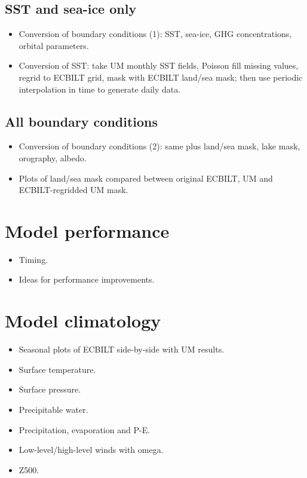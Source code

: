 \documentclass[a4paper,11pt,article]{memoir}
\begin{document}
\section{SST and sea-ice only}

\begin{itemize}
  \item{Conversion of boundary conditions (1): SST, sea-ice, GHG
    concentrations, orbital parameters.}
  \item{Conversion of SST: take UM monthly SST fields, Poisson fill
    missing values, regrid to ECBILT grid, mask with ECBILT land/sea
    mask; then use periodic interpolation in time to generate daily
    data.}
\end{itemize}

\section{All boundary conditions}

\begin{itemize}
  \item{Conversion of boundary conditions (2): same plus land/sea
    mask, lake mask, orography, albedo.}
  \item{Plots of land/sea mask compared between original ECBILT, UM
    and ECBILT-regridded UM mask.}
\end{itemize}


\chapter{Model performance}

\begin{itemize}
  \item{Timing.}
  \item{Ideas for performance improvements.}
\end{itemize}


\chapter{Model climatology}

\begin{itemize}
  \item{Seasonal plots of ECBILT side-by-side with UM results.}
  \item{Surface temperature.}
  \item{Surface pressure.}
  \item{Precipitable water.}
  \item{Precipitation, evaporation and P-E.}
  \item{Low-level/high-level winds with omega.}
  \item{Z500.}
\end{itemize}
\end{document}
